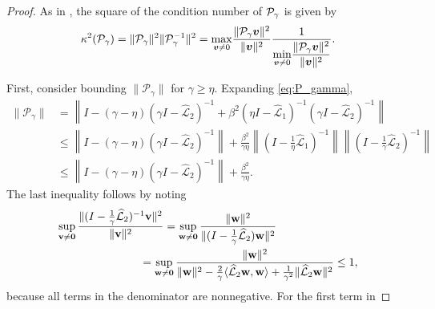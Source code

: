 \documentclass[review]{siamart}
\begin{document}
\begin{proof}
As in \cite[Th. 5]{irk1}, the square of the condition number of ${\cal P}_{\gamma}$
is given by
%
\begin{align}
\label{eq:kappa_def2}
\kappa^2({\cal P}_{\gamma})
=
\Vert {\cal P}_{\gamma} \Vert^2
\Vert {\cal P}_{\gamma}^{-1} \Vert^2
=
\underset{{\bm{v} \neq 0}}{\max} \frac{\Vert {\cal P}_{\gamma} \bm{v} \Vert^2 }{\Vert \bm{v} \Vert^2}
\frac{1}{\displaystyle{\underset{{\bm{v} \neq 0}}{\min} \frac{\Vert {\cal P}_{\gamma} \bm{v} \Vert^2 }{\Vert \bm{v} \Vert^2}}}.
\end{align}

First, consider bounding $\|\mathcal{P}_\gamma\|$ for $\gamma \geq \eta$. Expanding
\eqref{eq:P_gamma},
%
\begin{align}\nonumber
\|\mathcal{P}_\gamma\| & = \left\| I - (\gamma - \eta)
	( \gamma I- \widehat{\mathcal{L}}_2)^{-1} +
	\beta^2( \eta I- \widehat{\mathcal{L}}_1)^{-1}
	( \gamma I -\widehat{\mathcal{L}}_2)^{-1} \right\| \\
& \leq \left\| I - (\gamma - \eta)(\gamma I -\widehat{\mathcal{L}}_2)^{-1}\right\| +
		\frac{\beta^2}{\gamma\eta}
		\left\|( I- \tfrac{1}{\eta}\widehat{\mathcal{L}}_1)^{-1} \right\|
		\left\|( I- \tfrac{1}{\gamma}\widehat{\mathcal{L}}_2)^{-1}\right\|\nonumber \\
& \leq \left\| I - (\gamma - \eta)(\gamma I -\widehat{\mathcal{L}}_2)^{-1}\right\| +
		\frac{\beta^2}{\gamma\eta}\label{eq:Pgn}.
\end{align}
%
The last inequality follows by noting
%
\begin{align*}
\sup_{\mathbf{v}\neq\mathbf{0}} \frac{\|( I- \tfrac{1}{\gamma}
	\widehat{\mathcal{L}}_2)^{-1}\mathbf{v}\|^2}{\|\mathbf{v}\|^2}
& = \sup_{\mathbf{w}\neq\mathbf{0}} \frac{\|\mathbf{w}\|^2}{\|( I- \tfrac{1}{\gamma}
	\widehat{\mathcal{L}}_2)\mathbf{w}\|^2} \\
&\hspace{-5ex}= \sup_{\mathbf{w}\neq\mathbf{0}} \frac{\|\mathbf{w}\|^2}{{\|\mathbf{w}\|^2 -
	\tfrac{2}{\gamma} \langle \widehat{\mathcal{L}}_2
	\mathbf{w},\mathbf{w}\rangle + \tfrac{1}{\gamma^2}\|\widehat{\mathcal{L}}_2\mathbf{w}\|^2}}
\leq 1,
\end{align*}
%
because all terms in the denominator are nonnegative. For the first term in

\end{proof}
\end{document}
